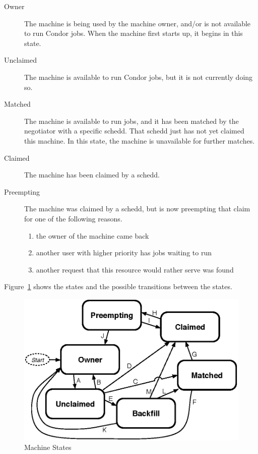 \begin{description}
  
\item[Owner] The machine is being used by the machine owner, and/or
  is not available to run Condor jobs.
  When the machine first starts up, it begins in this state.
  
\item[Unclaimed] The machine is available to run Condor jobs, but it is
  not currently doing so.
  
\item[Matched] The machine is available to run jobs, and it has been
  matched by the negotiator with a specific schedd.
  That schedd just has not yet claimed this machine.
  In this state, the machine is unavailable for further matches.

\item[Claimed] The machine has been claimed by a schedd. 
  
\item[Preempting] The machine was claimed by a schedd, but is now
  preempting that claim for one of the following reasons.
  \begin{enumerate}
  \item the owner of the machine came back
  \item another user with higher priority has jobs waiting to run
  \item another request that this resource would rather serve was found
  \end{enumerate}

\end{description}

Figure~\ref{fig:machine-states} shows
the states and the possible transitions between the states.

\begin{figure}[hbt]
\centering
\includegraphics{admin-man/machine-states.eps}
\caption{\label{fig:machine-states}Machine States}
\end{figure}


